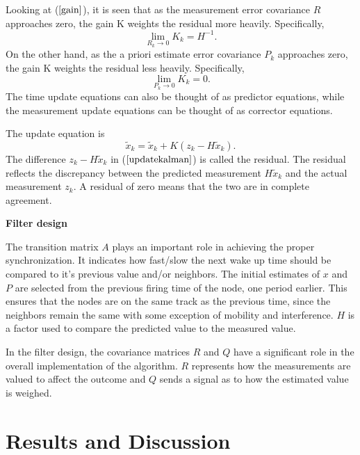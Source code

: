 \documentclass[journal]{IEEEtran}
\begin{document}
Looking at ($\ref{gain}$), it is seen that as the measurement error
covariance $R$ approaches zero, the gain K weights the residual more
heavily. Specifically,
\begin{equation}
\mathop {\lim }\limits_{R_k \to 0 } {K_k} = H^{-1}.
\end{equation}
On the other hand, as the a priori estimate error covariance $P_k$
approaches zero, the gain K weights the residual less heavily.
Specifically,
\begin{equation}
\mathop {\lim }\limits_{P_k \to 0 } {K_k} = 0.
\end{equation}
The time update equations can also be thought of as predictor
equations, while the measurement update equations can be thought of
as corrector equations.
\par 
The update equation is
\begin{equation}
\tilde x_k = \tilde x_k + K(z_k-H\tilde x_k).
\label{updatekalman}
\end{equation}
The difference $z_k - H\tilde x_k$ in ($\ref{updatekalman}$) is called
the residual. The residual reflects the discrepancy between the
predicted measurement $H\tilde x_k$ and the actual measurement
$z_k$. A residual of zero means that the two are in complete
agreement. \par
\textbf{Filter design} \par
The transition matrix $A$ plays an important role in achieving
the proper synchronization. It indicates how fast/slow the next wake up time should be compared
to it's previous value and/or neighbors. The initial estimates of $x$ and $P$ are selected from the
previous firing time of the node, one period earlier. This ensures that the nodes are on the same track as the previous time, since the neighbors remain the same with some exception of mobility and interference. $H$ is a factor used to compare the predicted value to the measured value. \par
In the filter design, the covariance matrices $R$ and $Q$ have a significant
role in the overall implementation of the algorithm. $R$ represents how
 the measurements are valued to affect the outcome and $Q$
sends a signal as to how the estimated value is weighed.
\section{\textbf{Results and Discussion}}
\end{document}
